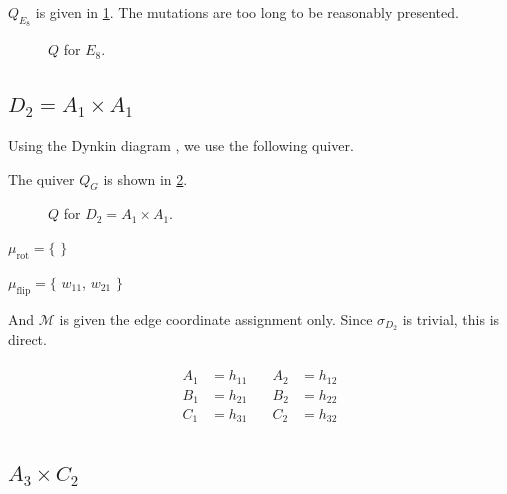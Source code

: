 \documentclass{amsart}
\theoremstyle{plain}
\theoremstyle{definition}
\theoremstyle{remark}
\newcommand{\conftoquiv}{\mathcal{M}}
\newcommand{\muflip}{{\mu_{\text{flip}}}}
\newcommand{\murot}{{\mu_{\text{rot}}}}
\newlength\inlmutseqhang
\newcommand{\inlmutseq}[2]{%
  {\small%
    \settowidth\inlmutseqhang{$#1 = \big\{~$~}%
    \hangindent\inlmutseqhang%
    \noindent $#1 = \big\{$ #2 $\big\}$\par}%
}
\newcommand{\inldynkinDtwo}{\raisebox{-0.0ex}{}}
\begin{document}
  {\centering 

  } $Q_{E_8}$ is given in \cref{fig:QE8}. The mutations are too long to
  be reasonably presented.

  \begin{figure}
    \centering 

    \caption{$Q$ for $E_8$.
      \label{fig:QE8}
    }
  \end{figure}

  \subsection{\texorpdfstring{$D_2 = A_1 \times A_1$}{D\_2 = A\_1 x
      A\_1}}

  Using the Dynkin diagram \inldynkinDtwo, we use the following quiver.

  {\centering 

  } The quiver $Q_G$ is shown in \cref{fig:QD2}.

  \begin{figure}
    \centering 

    \caption{$Q$ for $D_2 = A_1 \times A_1$.
      \label{fig:QD2}
    }
  \end{figure}

  \inlmutseq{\murot}{ }

  \inlmutseq{\muflip}{ $w_{1 1}$, $w_{2 1}$ }

  And $\conftoquiv$ is given the edge coordinate assignment only. Since
  $\sigma_{D_2}$ is trivial, this is direct.

  \begin{equation*}
    \begin{gathered}
      \begin{aligned}
        A_1 &= h_{11} &\quad A_2 &= h_{12} \\
        B_1 &= h_{21} &\quad B_2 &= h_{22} \\
        C_1 &= h_{31} &\quad C_2 &= h_{32}
      \end{aligned}
    \end{gathered}
  \end{equation*}

  \subsection{\texorpdfstring{$A_3 \times C_2$}{A\_3 x C\_2}}
\end{document}
